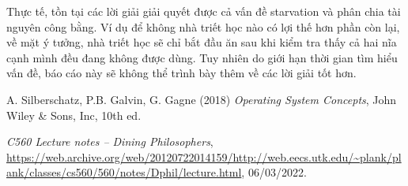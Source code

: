 \documentclass{article}
\begin{document}
Thực tế, tồn tại các lời giải giải quyết được cả vấn đề starvation và phân chia tài nguyên công bằng.
Ví dụ để không nhà triết học nào có lợi thế hơn phần còn lại, về mặt ý tưởng, nhà triết học sẽ chỉ bắt đầu ăn sau khi kiểm tra
thấy cả hai nĩa cạnh mình đều đang không được dùng. Tuy nhiên do giới hạn thời gian tìm hiểu vấn đề, báo cáo này
sẽ không thể trình bày thêm về các lời giải tốt hơn.

\begin{thebibliography}{9}
    A. Silberschatz, P.B. Galvin, G. Gagne (2018) \emph{Operating System Concepts}, John Wiley \& Sons, Inc, 10th ed.

    \emph{C560 Lecture notes -- Dining Philosophers}, \url{https://web.archive.org/web/20120722014159/http://web.eecs.utk.edu/~plank/plank/classes/cs560/560/notes/Dphil/lecture.html}, 06/03/2022.
\end{thebibliography}
\end{document}
